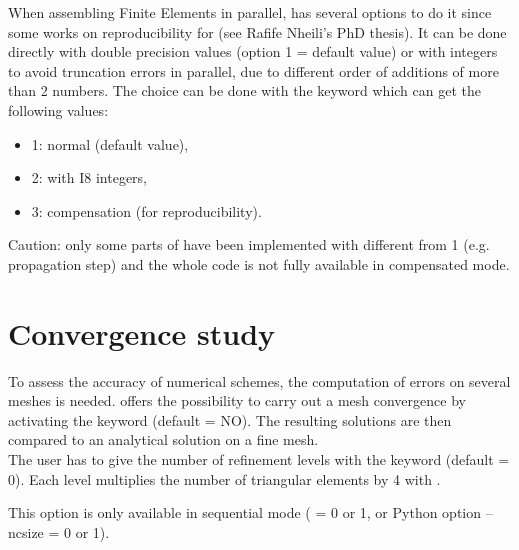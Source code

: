 When assembling Finite Elements in parallel,  has several options
to do it since some works on reproducibility for \tel
(see Rafife Nheili's PhD thesis).
It can be done directly with double precision values
(option 1 = default value)
or with integers to avoid truncation errors in parallel, due to different
order of additions of more than 2 numbers.
The choice can be done with the keyword 
which can get the following values:
\begin{itemize}
\item 1: normal (default value),
\item 2: with I8 integers,
\item 3: compensation (for reproducibility).
\end{itemize}
Caution: only some parts of  have been implemented
with  different from 1
(e.g. propagation step) and the whole code is not fully available
in compensated mode.


\section{Convergence study}

To assess the accuracy of numerical schemes, the computation of errors
on several meshes is needed.
 offers the possibility to carry out a mesh convergence
by activating the keyword  (default = NO).
The resulting solutions are then compared to an analytical solution
on a fine mesh.\\

The user has to give the number of refinement levels with the keyword
 (default = 0).
Each level multiplies the number of triangular elements by 4 with \stbtel.

This option is only available in sequential mode
( = 0 or 1, or Python option --ncsize = 0 or 1).
